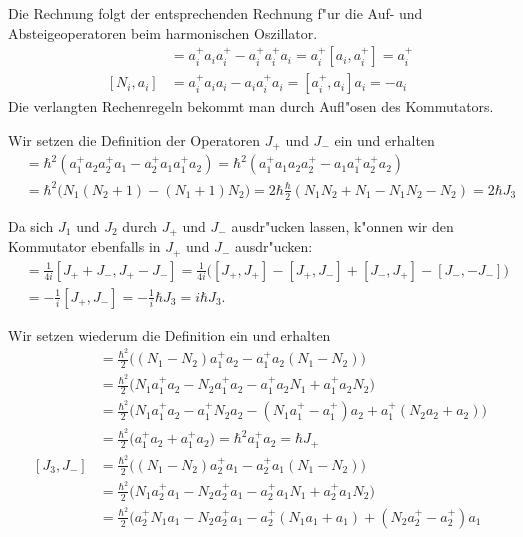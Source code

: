 \begin{loesung}
\begin{teilaufgaben}
\item Die Rechnung folgt der entsprechenden Rechnung f"ur die Auf- und
Absteigeoperatoren beim harmonischen Oszillator.
\begin{align*}
[N_i,a_i^+]
&=
a_i^+a_ia_i^+-a_i^+a_i^+a_i
=
a_i^+[a_i,a_i^+]=a_i^+
\\
[N_i,a_i]
&=
a_i^+a_ia_i-a_ia_i^+a_i
=
[a_i^+,a_i]a_i
=-a_i
\end{align*}
Die verlangten Rechenregeln bekommt man durch Aufl"osen des Kommutators.
\item
Wir setzen die Definition der Operatoren $J_+$ und $J_-$ ein und
erhalten
\begin{align*}
[J_+,J_-]
&=
\hbar^2(a_1^+a_2a_2^+a_1 - a_2^+a_1a_1^+a_2)
=
\hbar^2(a_1^+a_1 a_2a_2^+ - a_1a_1^+ a_2^+a_2)
\\
&=
\hbar^2\bigg(N_1(N_2+1)- (N_1+1)N_2\bigg)
=2\hbar\frac{\hbar}2(N_1N_2+N_1-N_1N_2-N_2)=2\hbar J_3
\end{align*}
\item
Da sich $J_1$ und $J_2$ durch $J_+$ und $J_-$ ausdr"ucken lassen,
k"onnen wir den Kommutator ebenfalls in $J_+$ und $J_-$
ausdr"ucken:
\begin{align*}
[J_1,J_2]
&=
\frac{1}{4i}[J_++J_-,J_+-J_-]
=
\frac{1}{4i}\bigl(
[J_+,J_+] -[J_+,J_-] +[J_-,J_+] -[J_-,-J_-]
\bigr)
\\
&=
-\frac1{i}[J_+,J_-]
=
-\frac1{i}\hbar J_3
=i\hbar J_3.
\end{align*}
\item
Wir setzen wiederum die Definition ein und erhalten
\begin{align*}
[J_3,J_+]
&=
\frac{\hbar^2}2\bigl(
(N_1-N_2) a_1^+a_2 - a_1^+a_2 (N_1-N_2)
\bigr)
\\
&=
\frac{\hbar^2}2\bigl(
N_1 a_1^+a_2 - N_2 a_1^+ a_2 - a_1^+a_2 N_1 + a_1^+a_2 N_2
\bigr)
\\
&=
\frac{\hbar^2}2\bigl(
N_1a_1^+ a_2
-
a_1^+ N_2 a_2
-
(N_1a_1^+-a_1^+)a_2
+
a_1^+(N_2a_2 +a_2)
\bigl)
\\
&=\frac{\hbar^2}{2}
\bigl( a_1^+a_2 +a_1^+a_2
\bigr)
=\hbar^2 a_1^+a_2=\hbar J_+
\\
[J_3,J_-]
&=
\frac{\hbar^2}2\bigl(
(N_1-N_2) a_2^+a_1 - a_2^+a_1 (N_1-N_2)
\bigr)
\\
&=
\frac{\hbar^2}2\bigl(
N_1 a_2^+a_1 - N_2 a_2^+ a_1 - a_2^+a_1 N_1 + a_2^+a_1 N_2
\bigr)
\\
&=
\frac{\hbar^2}2\bigl( 
a_2^+N_1 a_1 - N_2 a_2^+ a_1 - a_2^+(N_1a_1+a_1) + (N_2a_2^+-a_2^+)a_1

\end{align*}
\end{teilaufgaben}
\end{loesung}
